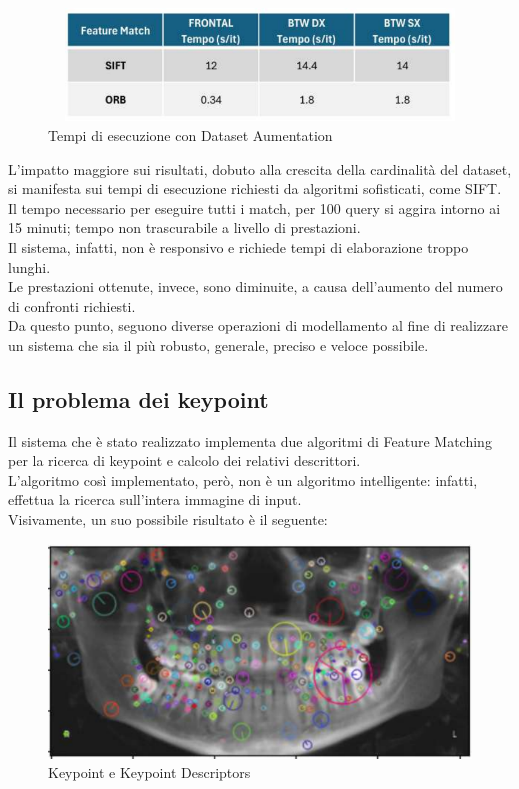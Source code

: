 \documentclass[12pt,a4paper,openright,twoside]{book}
\begin{document}
\begin{figure}[H]
	\centering
	\includegraphics[height=3cm,width=13cm]{figures/tempi1.pdf}
    	\caption{Tempi di esecuzione con Dataset Aumentation}
	\label{fig:tempi1}
\end{figure}

L'impatto maggiore sui risultati, dobuto alla crescita della cardinalità del dataset, si manifesta sui tempi di esecuzione richiesti da algoritmi sofisticati, come SIFT. Il tempo necessario per eseguire tutti i match, per 100 query si aggira intorno ai 15 minuti; tempo non trascurabile a livello di prestazioni.\\
Il sistema, infatti, non è responsivo e richiede tempi di elaborazione troppo lunghi.\\

Le prestazioni ottenute, invece, sono diminuite,  a causa dell'aumento del numero di confronti richiesti.\\
Da questo punto, seguono diverse operazioni di modellamento al fine di realizzare un sistema che sia il più robusto, generale, preciso e veloce possibile.

\subsection{Il problema dei keypoint}
Il sistema che è stato realizzato implementa due algoritmi di Feature Matching per la ricerca di keypoint e calcolo dei relativi descrittori. \\
L'algoritmo così implementato, però, non è un algoritmo intelligente: infatti, effettua la ricerca sull'intera immagine di input.\\

Visivamente, un suo possibile risultato è il seguente:
\begin{figure}[H]
	\centering
	\includegraphics[width=14cm]{figures/keypointall.pdf}
    	\caption{Keypoint e Keypoint Descriptors}
	\label{fig:keypointall}
\end{figure}
\end{document}
